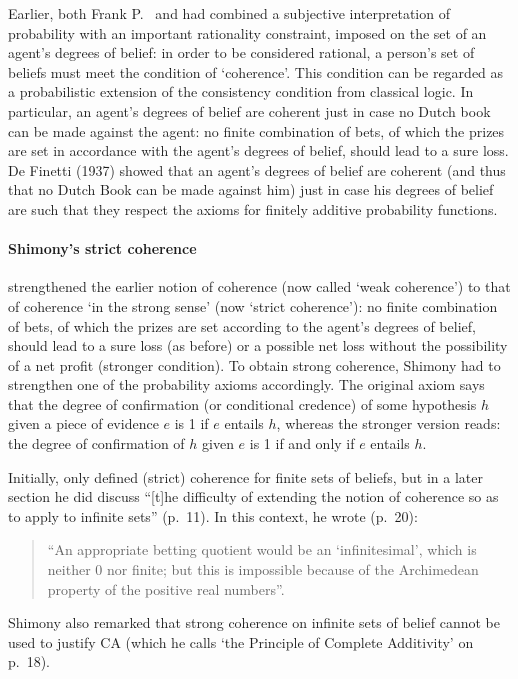 Earlier, both Frank P.~\citet{Ramsey:1926} and \citet{deFinetti:1937} had combined a subjective interpretation of probability with an important rationality constraint, imposed on the set of an agent's degrees of belief: in order to be considered rational, a person's set of beliefs must meet the condition of `coherence'. This condition can be regarded as a probabilistic extension of the consistency condition from classical logic.
In particular, an agent's degrees of belief are coherent just in case no Dutch book can be made against the agent: no finite combination of bets, of which the prizes are set in accordance with the agent's degrees of belief, should lead to a sure loss. De Finetti (1937) showed that an agent's degrees of belief are coherent (and thus that no Dutch Book can be made against him) just in case his degrees of belief are such that they respect the axioms for finitely additive probability functions.

\paragraph{Shimony's strict coherence}
\citet{Shimony:1955} strengthened the earlier notion of coherence (now called `weak coherence') to that of coherence `in the strong sense' (now `strict coherence'): no finite combination of bets, of which the prizes are set according to the agent's degrees of belief, should lead to a sure loss (as before) or a possible net loss without the possibility of a net profit (stronger condition).
To obtain strong coherence, Shimony had to strengthen one of the probability axioms accordingly.
The original axiom says that the degree of confirmation (or conditional credence) of some hypothesis $h$ given a piece of evidence $e$ is 1 if $e$ entails $h$, whereas the stronger version reads: the degree of confirmation of $h$ given $e$ is 1 if and only if $e$ entails $h$.

Initially, \citet{Shimony:1955} only defined (strict) coherence for finite sets of beliefs, but in a later section he did discuss ``[t]he difficulty of extending the notion of coherence so as to apply to infinite sets'' (p.~11).
In this context, he wrote (p.~20):
\begin{quote}
``An appropriate betting quotient would be an `infinitesimal', which is neither 0 nor finite; but this is impossible because of the Archimedean property of the positive real numbers''.
\end{quote}
Shimony also remarked that strong coherence on infinite sets of belief cannot be used to justify CA (which he calls `the Principle of Complete Additivity' on p.~18).

